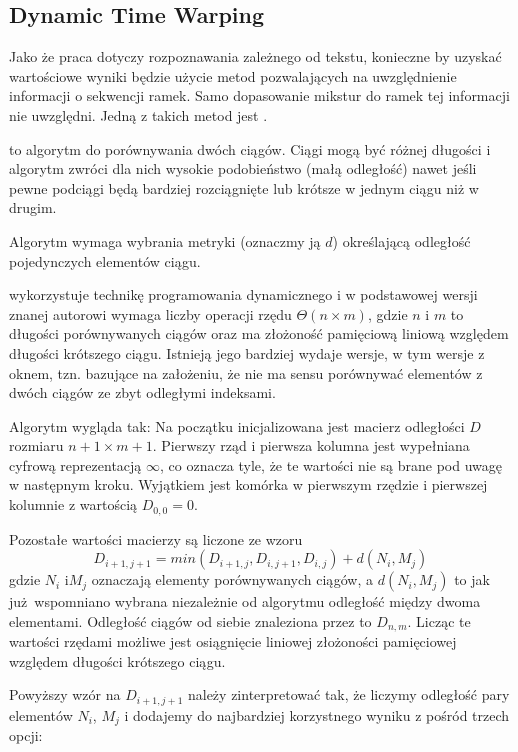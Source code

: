 \subsection{Dynamic Time Warping}\label{sec:dtw}

Jako że praca dotyczy rozpoznawania zależnego od tekstu, konieczne by uzyskać wartościowe wyniki będzie
użycie metod pozwalających na uwzględnienie informacji o sekwencji ramek. Samo dopasowanie mikstur do ramek
tej informacji nie uwzględni. Jedną z takich metod jest .

 to algorytm do porównywania dwóch ciągów. Ciągi mogą być różnej długości i algorytm zwróci
dla nich wysokie podobieństwo (małą odległość) nawet jeśli pewne podciągi będą bardziej rozciągnięte lub krótsze
w jednym ciągu niż w drugim.

Algorytm wymaga wybrania metryki (oznaczmy ją $d$) określającą odległość pojedynczych elementów ciągu.

 wykorzystuje technikę programowania dynamicznego i w podstawowej wersji znanej autorowi wymaga liczby operacji
rzędu $\Theta(n \times m)$, gdzie $n$ i $m$ to długości porównywanych ciągów oraz ma złożoność pamięciową liniową
względem długości krótszego ciągu. Istnieją jego bardziej wydaje wersje, w tym wersje z oknem, tzn. bazujące na
założeniu, że nie ma sensu porównywać elementów z dwóch ciągów ze zbyt odległymi indeksami.

Algorytm wygląda tak: Na początku inicjalizowana jest macierz odległości $D$ rozmiaru $n + 1 \times m + 1$. Pierwszy
rząd i pierwsza kolumna jest wypełniana cyfrową reprezentacją $\infty$, co oznacza tyle,
że te wartości nie są brane pod uwagę w następnym kroku.
Wyjątkiem jest komórka w pierwszym rzędzie i pierwszej kolumnie z wartością $D_{0,0} = 0$.

Pozostałe wartości macierzy są liczone ze wzoru
$$D_{i+1, j+1} = min(D_{i+1, j}, D_{i, j+1}, D_{i, j}) + d(N_i, M_j)$$
gdzie $N_i$ i$M_j$ oznaczają elementy porównywanych ciągów, a $d(N_i, M_j)$ to jak już wspomniano wybrana
niezależnie od algorytmu odległość między dwoma elementami. Odległość ciągów od siebie znaleziona przez 
to $D_{n, m}$.  Licząc te wartości rzędami możliwe jest osiągnięcie liniowej złożoności pamięciowej względem
długości krótszego ciągu.

Powyższy wzór na $D_{i+1, j+1}$ należy zinterpretować tak, że liczymy odległość pary elementów $N_i$, $M_j$ i dodajemy
do najbardziej korzystnego wyniku z pośród trzech opcji:

